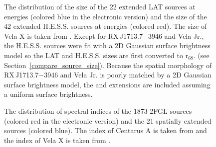 \documentclass[12pt,preprint]{aastex}
\newif\ifcolorfigure
\newcommand{\gev}{\text{GeV}\xspace}
\newcommand{\tev}{\text{TeV}\xspace}
\newcommand{\rsixeight}{{\ensuremath{\text{r}_{68}}}\xspace}
\begin{document}
\clearpage
\begin{figure}
    \ifcolorfigure
      \plotone{summary_plots/gev_vs_tev_histogram_color.eps}
    \else
    \fi
    \caption{
    The distribution of the size of the 22 extended LAT sources
    at \gev energies
    (colored blue in the electronic version) and the size of the
    42 extended H.E.S.S. sources at \tev energies
    (colored red).  The size of Vela X
    is taken from \cite{velax}.  Except for RX\,J1713.7$-$3946 and
    Vela Jr., the H.E.S.S. sources were fit with a 2D Gaussian surface
    brightness model so the LAT and H.E.S.S. sizes are first converted
    to \rsixeight.  (see Section~\ref{compare_source_size}). Because
    the spatial morphology of RX\,J1713.7$-$3946 and Vela Jr. is poorly
    matched by a 2D Gaussian surface brightness model, the \gev and \tev
    extensions are included assuming a uniform surface brightness.
    }\label{gev_vs_tev_histogram}
  \end{figure}

\clearpage
\begin{figure}
    \ifcolorfigure
      \plotone{summary_plots/compare_index_2FGL_color.eps}
    \else
    \fi
    \caption{
    The distribution of spectral indices of the 1873 2FGL sources
    (colored red in the electronic version) and the 21 spatially extended
    sources (colored blue).  The index of Centarus A is taken from
    \cite{second_cat} and the index of Vela X is taken from \cite{velax}.
    }\label{compare_index_2FGL}
  \end{figure}
\end{document}
